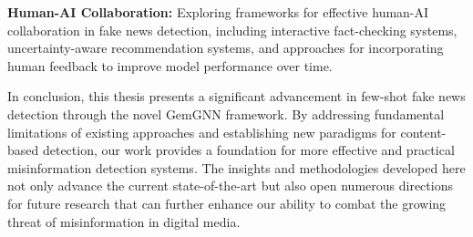 \textbf{Human-AI Collaboration:} Exploring frameworks for effective human-AI collaboration in fake news detection, including interactive fact-checking systems, uncertainty-aware recommendation systems, and approaches for incorporating human feedback to improve model performance over time.

In conclusion, this thesis presents a significant advancement in few-shot fake news detection through the novel GemGNN framework. By addressing fundamental limitations of existing approaches and establishing new paradigms for content-based detection, our work provides a foundation for more effective and practical misinformation detection systems. The insights and methodologies developed here not only advance the current state-of-the-art but also open numerous directions for future research that can further enhance our ability to combat the growing threat of misinformation in digital media.

\EndChapter
